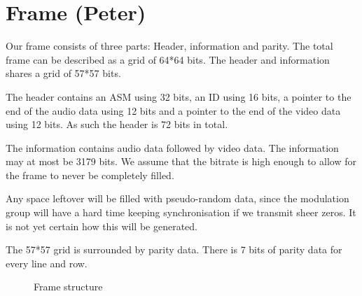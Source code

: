 \section{Frame (Peter)}
Our frame consists of three parts: Header, information and parity. The total frame can be described as a grid of 64*64 bits. The header and information shares a grid of 57*57 bits.

The header contains an ASM using 32 bits, an ID using 16 bits, a pointer to the end of the audio data using 12 bits and a pointer to the end of the video data using 12 bits. As such the header is 72 bits in total.

The information contains audio data followed by video data. The information may at most be 3179 bits. We assume that the bitrate is high enough to allow for the frame to never be completely filled.

Any space leftover will be filled with pseudo-random data, since the modulation group will have a hard time keeping synchronisation if we transmit sheer zeros. It is not yet certain how this will be generated.

The 57*57 grid is surrounded by parity data. There is 7 bits of parity data for every line and row.

\begin{figure}
  \centering
  \caption{Frame structure}
  \label{fig:frame-structure}
\end{figure}
